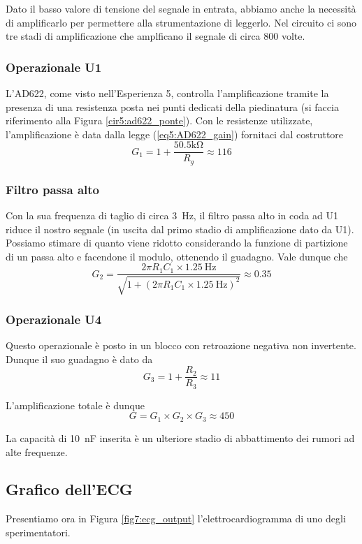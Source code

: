 Dato il basso valore di tensione del segnale in entrata, abbiamo anche la necessità di amplificarlo per permettere alla strumentazione di leggerlo. Nel circuito ci sono tre stadi di amplificazione che amplficano il segnale di circa 800 volte.

\subsubsection*{Operazionale U1}
L'AD622, come visto nell'Esperienza 5, controlla l'amplificazione tramite la presenza di una resistenza posta nei punti dedicati della piedinatura (si faccia riferimento alla Figura \ref{cir5:ad622_ponte}). Con le resistenze utilizzate, l'amplificazione è data dalla legge (\ref{eq5:AD622_gain}) fornitaci dal costruttore
$$G_1=1+\frac{50.5 \si{\kilo\ohm}}{R_g} \approx 116$$

\subsubsection*{Filtro passa alto}
Con la sua frequenza di taglio di circa \SI{3}{\Hz}, il filtro passa alto in coda ad U1 riduce il nostro segnale (in uscita dal primo stadio di amplificazione dato da U1). Possiamo stimare di quanto viene ridotto considerando la funzione di partizione di un passa alto e facendone il modulo, ottenendo il guadagno. Vale dunque che
$$G_2=\frac{2 \pi R_1 C_1 \times \SI{1.25}{\Hz}}{\sqrt{1+(2 \pi R_1 C_1 \times \SI{1.25}{\Hz})^2}}\approx 0.35$$

\subsubsection*{Operazionale U4}
Questo operazionale è posto in un blocco con retroazione negativa non invertente. Dunque il suo guadagno è dato da
$$G_3=1+\frac{R_2}{R_3} \approx 11$$

L'amplificazione totale è dunque
$$G = G_1 \times G_2 \times G_3 \approx 450$$

La capacità di \SI{10}{\nano\farad} inserita è un ulteriore stadio di abbattimento dei rumori ad alte frequenze.

\subsection{Grafico dell'ECG}

Presentiamo ora in Figura \ref{fig7:ecg_output} l'elettrocardiogramma di uno degli sperimentatori.

